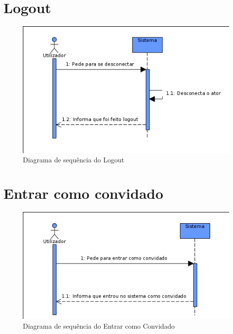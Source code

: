 \documentclass[a4paper]{report}
\begin{document}
\section{Logout}
\begin{figure}[H]
	\centering 
    \includegraphics[width=\textwidth]{images/logoutSeq.png}  
    \caption{Diagrama de sequência do Logout}
\end{figure}

\section{Entrar como convidado}
\begin{figure}[H]
	\centering 
    \includegraphics[width=\textwidth]{images/convidadoSeq.png}  
    \caption{Diagrama de sequência do Entrar como Convidado}
\end{figure}
\end{document}
